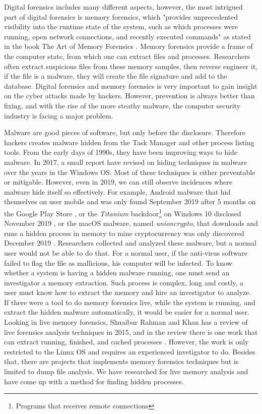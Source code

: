 Digital forensics includes many different aspects, however, the most intrigued part of digital forensics is memory forensics, which "provides unprecedented visibility into the runtime state of the system, such as which processes were running, open network connections, and recently executed commands" as stated in the book The Art of Memory Forensics \cite{ligh2014art}. Memory forensics provide a frame of the computer state, from which one can extract files and processes. Researchers often extract suspicious files from these memory samples, then reverse engineer it, if the file is a malware, they will create the file signature and add to the database. Digital forensics and memory forensics is very important to gain insight on the cyber attacks made by hackers. However, prevention is always better than fixing, and with the rise of the more steathy malware, the computer security industry is facing a major problem.

Malware are good pieces of software, but only before the disclosure. Therefore hackers creates malware hidden from the Task Manager and other process listing tools. From the early days of 1990s, they have been improving ways to hide malware. In 2017, a small report \cite{evolutionHidding} have revised on hiding techniques in malware over the years in the Windows OS. Most of these techniques is either preventable or mitigable. However, even in 2019, we can still observe incidences where malware hide itself so effectively. For example, Android malware that hid themselves on user mobile and was only found September 2019 after 5 months on the Google Play Store \cite{hiddenMalwareAndroid}, or the \textit{Titanium} backdoor\footnote{Programs that receives remote connections} on Windows 10 disclosed November 2019 \cite{titanium}, or the macOS malware, named \textit{unioncrypto}, that downloads and runs a hidden process in memory to mine cryptocurrency was only discovered December 2019 \cite{unioncrypto}. Researchers collected and analyzed these malware, but a normal user would not be able to do that. For a normal user, if the anti-virus software failed to flag the file as mallicious, his computer will be infected. To know whether a system is having a hidden malware running, one must send an investigator a memory extraction. Such process is complex, long and costly, a user must know how to extract the memory and hire an investigator to analyze. If there were a tool to do memory forensics live, while the system is running, and extract the hidden malware automatically, it would be easier for a normal user. Looking in live memory forensics, Shuaibur Rahman and Khan \cite{reviewLive} has a review of live forensics analysis techniques in 2015, and in the review there is one work that can extract running, finished, and cached processes \cite{comparativeLive}. However, the work is only restricted to the Linux OS and requires an experienced invetigator to do. Besides that, there are projects that implements memory forensics techniques but is limited to dump file analysis. We have researched for live memory analysis and have come up with a method for finding hidden processes.

